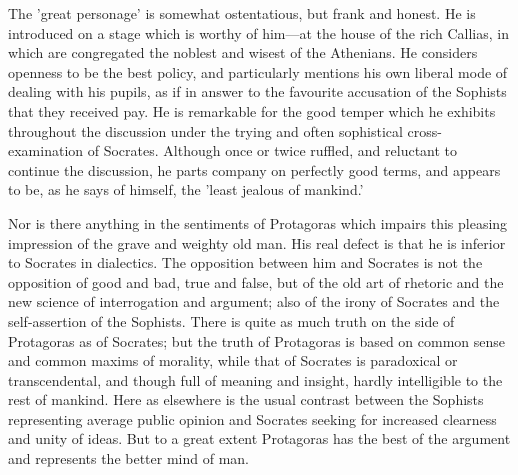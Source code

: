 \documentclass[11pt,letter]{article}
\begin{document}
\par  The 'great personage' is somewhat ostentatious, but frank and honest. He is introduced on a stage which is worthy of him—at the house of the rich Callias, in which are congregated the noblest and wisest of the Athenians. He considers openness to be the best policy, and particularly mentions his own liberal mode of dealing with his pupils, as if in answer to the favourite accusation of the Sophists that they received pay. He is remarkable for the good temper which he exhibits throughout the discussion under the trying and often sophistical cross-examination of Socrates. Although once or twice ruffled, and reluctant to continue the discussion, he parts company on perfectly good terms, and appears to be, as he says of himself, the 'least jealous of mankind.'

\par  Nor is there anything in the sentiments of Protagoras which impairs this pleasing impression of the grave and weighty old man. His real defect is that he is inferior to Socrates in dialectics. The opposition between him and Socrates is not the opposition of good and bad, true and false, but of the old art of rhetoric and the new science of interrogation and argument; also of the irony of Socrates and the self-assertion of the Sophists. There is quite as much truth on the side of Protagoras as of Socrates; but the truth of Protagoras is based on common sense and common maxims of morality, while that of Socrates is paradoxical or transcendental, and though full of meaning and insight, hardly intelligible to the rest of mankind. Here as elsewhere is the usual contrast between the Sophists representing average public opinion and Socrates seeking for increased clearness and unity of ideas. But to a great extent Protagoras has the best of the argument and represents the better mind of man.
\end{document}
